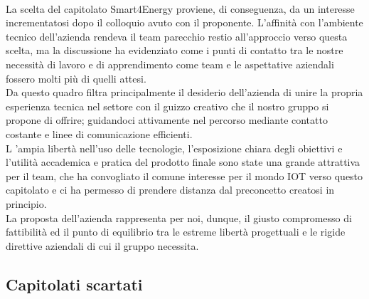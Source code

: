 \paragraph{}
La scelta del capitolato Smart4Energy proviene, di conseguenza, da un interesse
incrementatosi dopo il colloquio avuto con il proponente. L'affinità con l'ambiente
tecnico dell'azienda rendeva il team parecchio restio all'approccio verso questa
scelta, ma la discussione ha evidenziato come i punti di contatto tra le nostre
necessità di lavoro e di apprendimento come team e le aspettative aziendali fossero
molti più di quelli attesi. \\
Da questo quadro filtra principalmente il desiderio dell'azienda di unire la propria
esperienza tecnica nel settore con il guizzo creativo che il nostro gruppo si
propone di offrire; guidandoci attivamente nel percorso mediante contatto costante
e linee di comunicazione efficienti. \\
L 'ampia libertà nell'uso delle tecnologie, l'esposizione chiara degli obiettivi e
l'utilità accademica e pratica del prodotto finale sono state una grande attrattiva
per il team, che ha convogliato il comune interesse per il mondo IOT verso questo
capitolato e ci ha permesso di prendere distanza dal preconcetto creatosi in principio. \\
La proposta dell'azienda rappresenta per noi, dunque, il giusto compromesso di fattibilità
ed il punto di equilibrio tra le estreme libertà progettuali e le rigide direttive aziendali di cui il gruppo necessita.
\subsection{Capitolati scartati}
